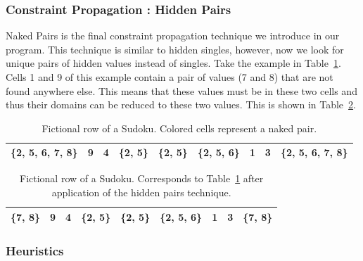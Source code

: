 \documentclass[11pt]{article} %
\begin{document}
\subsubsection{Constraint Propagation : Hidden Pairs}

Naked Pairs is the final constraint propagation technique we introduce in our program. This technique is similar to hidden singles, however, now we look for unique pairs of hidden values instead of singles.
Take the example in Table~\ref{tab:hiddenpairs}. Cells 1 and 9 of this example contain a pair of values (7 and 8) that are not found anywhere else. This means that these values must be in these two cells and thus their domains can be reduced to these two values. This is shown in Table~\ref{tab:hiddenpairs_after}.

\begin{table}[htbp]
    \caption{Fictional row of a Sudoku. Colored cells represent a naked pair.}
    \label{tab:hiddenpairs}
    \begin{center}
        \begin{tabular}{|c|c|c|c|c|c|c|c|c|}
        \hline
        \cellcolor[gray]{0.7}\{2, 5, 6, 7, 8\} & 9 & 4 & \{2, 5\} & \{2, 5\} & \{2, 5, 6\} & 1 & 3 & \cellcolor[gray]{0.7}\{2, 5, 6, 7, 8\}\\
        \hline
        \end{tabular}
    \end{center}
\end{table}

\begin{table}[htbp]
    \caption{Fictional row of a Sudoku. Corresponds to Table~\ref{tab:hiddenpairs} after application of the hidden pairs technique.}
    \label{tab:hiddenpairs_after}
    \begin{center}
        \begin{tabular}{|c|c|c|c|c|c|c|c|c|}
        \hline
        \cellcolor[gray]{0.7}\{7, 8\} & 9 & 4 & \{2, 5\} & \{2, 5\} & \{2, 5, 6\} & 1 & 3 & \cellcolor[gray]{0.7}\{7, 8\}\\
        \hline
        \end{tabular}
    \end{center}
\end{table}

\subsubsection{Heuristics}
\end{document}
